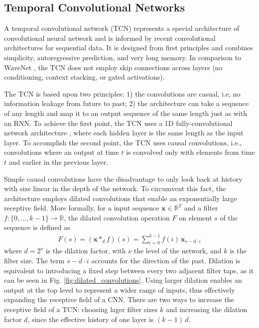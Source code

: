 \documentclass{scrartcl}
\begin{document}






\subsection{Temporal Convolutional Networks}

A temporal convolutional network (TCN) \cite{Bai2018} represents a special architecture of convolutional neural network and is informed by recent convolutional architectures for sequential data. It is designed from first principles and combines simplicity, autoregressive prediction, and very long memory. In comparison to WaveNet \cite{Oord2016}, the TCN does not employ skip connections across layers (no conditioning, context stacking, or gated activations).

The TCN is based upon two principles: 1) the convolutions are casual, i.e, no information leakage from future to past; 2) the architecture can take a sequence of any length and map it to an output sequence of the same length just as with an RNN. To achieve the first point, the TCN uses a 1D fully-convolutional network architecture \cite{Long2015}, where each hidden layer is the same length as the input layer. To accomplish the second point, the TCN uses causal convolutions, i.e., convolutions where an output at time $t$ is convolved only with elements from time $t$ and earlier in the previous layer.

Simple causal convolutions have the disadvantage to only look back at history with size linear in the depth of the network. To circumvent this fact, the architecture employs dilated convolutions that enable an exponentially large receptive field. More formally, for a input sequence $\mathbf x \in \mathbb R^T$ and a filter $f:\{ 0, \dots, k-1\} \rightarrow \mathbb R$, the dilated convolution operation $F$ on element $s$ of the sequence is defined as
\begin{align}
F(s) = (\mathbf x *_d f)(s) = \sum_{i=0}^{k-1} f(i) \, \mathbf x_{s-d\cdot i}
\end{align}
where $d = 2^\nu$ is the dilation factor, with $\nu$ the level of the network, and $k$ is the filter size. The term $s-d\cdot i$ accounts for the direction of the past. Dilation is equivalent to introducing a fixed  step between every two adjacent filter taps, as it can be seen in Fig. \ref{fig:dilated_convolutions}. Using larger dilation enables an output at the top level to represent a wider range of inputs, thus effectively expanding the receptive field of a CNN. There are two ways to increase the receptive field of a TCN: choosing lager filter sizes $k$ and increasing the dilation factor $d$, since the effective history of one layer is $(k-1) \, d$. 
\end{document}

